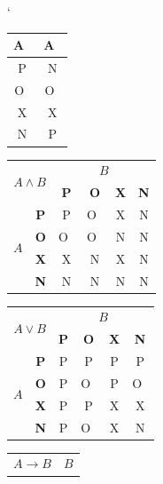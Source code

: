 \documentclass[11pt, a4paper]{article}
\begin{document}
\begin{table}[h] \catcode`
    \centering
        \begin{tabular}{|c|c|} \hline
            A~& A~\\ \hline
            P & N \\ \hline
            O~& O~\\ \hline
            X & X \\ \hline
            N & P \\\hline
        \end{tabular}
        \begin{tabular}{|cc|c|c|c|c|} \hline
            \multicolumn{2}{|c}{\multirow{2}{*}{$A \wedge B$}} & \multicolumn{4}{|c|}{$B$} \\ \cline{3-6}
             & & \textbf{P} & \textbf{O} & \textbf{X} & \textbf{N} \\ \hline
             \multicolumn{1}{|c|}{\multirow{4}{*}{$A$}} & \textbf{P} & P & O~& X & N \\ \cline{2-6}
             \multicolumn{1}{|c|}{} & \textbf{O} & O~& O~& N & N \\ \cline{2-6}
             \multicolumn{1}{|c|}{} & \textbf{X} & X & N & X & N \\ \cline{2-6}
             \multicolumn{1}{|c|}{} & \textbf{N} & N & N & N & N \\ \cline{2-6} \hline
        \end{tabular}
        \begin{tabular}{|cc|c|c|c|c|} \hline
            \multicolumn{2}{|c}{\multirow{2}{*}{$A \vee B$}} & \multicolumn{4}{|c|}{$B$} \\ \cline{3-6}
             & & \textbf{P} & \textbf{O} & \textbf{X} & \textbf{N} \\ \hline
             \multicolumn{1}{|c|}{\multirow{4}{*}{$A$}} & \textbf{P} & P & P & P & P \\ \cline{2-6}
             \multicolumn{1}{|c|}{} & \textbf{O} & P & O~& P & O~\\ \cline{2-6}
             \multicolumn{1}{|c|}{} & \textbf{X} & P & P & X & X \\ \cline{2-6}
             \multicolumn{1}{|c|}{} & \textbf{N} & P & O~& X & N \\ \cline{2-6} \hline
        \end{tabular}
        \begin{tabular}{|cc|c|c|c|c|} \hline
            \multicolumn{2}{|c}{\multirow{2}{*}{$A \to  B$}} & \multicolumn{4}{|c|}{$B$} \\ \cline{3-6}

\end{tabular}
\end{table}
\end{document}
